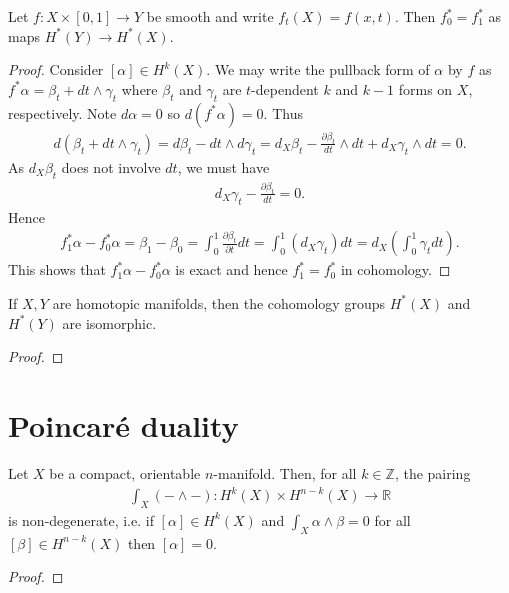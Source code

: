 \documentclass{article}
\begin{document}
\begin{lemma}
  Let $f:X\times[0,1]\to Y$ be smooth and write $f_t(X) = f(x,t)$.
  Then $f_0^*=f_1^*$ as maps $H^*(Y)\to H^*(X)$.
  \begin{proof} 
    Consider $[\alpha]\in H^k(X)$. We may write the pullback form
    of $\alpha$ by $f$ as $f^*\alpha = \beta_t + dt\wedge\gamma_t$
    where $\beta_t$ and $\gamma_t$ are $t$-dependent $k$ and $k-1$
    forms on $X$, respectively. Note $d\alpha = 0$ so $d(f^*\alpha)=0$.
    Thus
    \begin{align*}
      d(\beta_t + dt\wedge\gamma_t) = d\beta_t - dt\wedge d\gamma_t
      = d_X\beta_t - \frac{\partial \beta_t}{dt}\wedge dt + d_X \gamma_t \wedge dt = 0.
    \end{align*}
    As $d_X\beta_t$ does not involve $dt$, we must have
    \begin{align*}
      d_X \gamma_t - \frac{\partial \beta_t}{dt}  = 0.
    \end{align*}
    Hence
    \begin{align*}
      f_1^*\alpha - f_0^*\alpha = \beta_1 - \beta_0
      = \int_0^1 \frac{\partial\beta_t}{\partial t}dt
      = \int_0^1 (d_X\gamma_t) dt
      = d_X\left({\int_0^1 \gamma_t dt}\right).
    \end{align*}
    This shows that $f_1^*\alpha - f_0^*\alpha$ is exact and hence
    $f_1^*=f_0^*$ in cohomology.
  \end{proof}
\end{lemma}

\begin{theorem}
  If $X,Y$ are homotopic manifolds, then the cohomology groups
  $H^*(X)$ and $H^*(Y)$ are isomorphic.
  \begin{proof}
    \missingproof
  \end{proof}
\end{theorem}

\section{Poincar\'e duality}

\begin{theorem}
  Let $X$ be a compact, orientable $n$-manifold. Then,
  for all $k\in\mathbb{Z}$, the pairing
  \begin{align*}
    \int_X (-\wedge -) : H^k(X) \times H^{n-k}(X) \to \mathbb{R}
  \end{align*}
  is non-degenerate, i.e. if $[\alpha]\in H^k(X)$
  and $\int_X \alpha\wedge\beta=0$ for all $[\beta]\in H^{n-k}(X)$ then
  $[\alpha]=0$.
  \begin{proof}
    \missingproof
  \end{proof}
\end{theorem}
\end{document}
